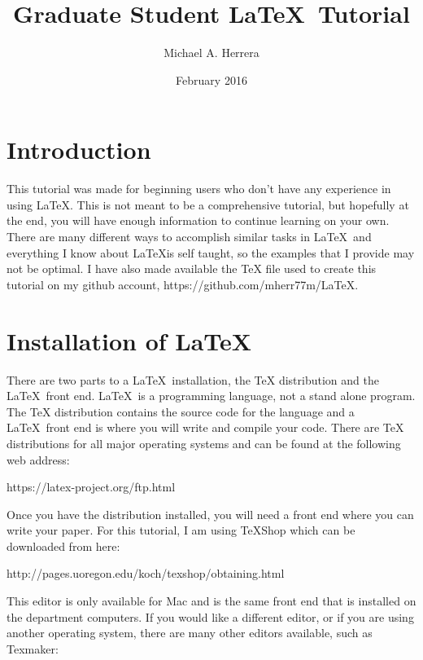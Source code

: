 \documentclass[12pt]{article}
\title{Graduate Student \LaTeX \ Tutorial}
\date{February 2016}
\author{Michael A. Herrera}
\begin{document}
\maketitle

\section{Introduction}

This tutorial was made for beginning users who don't have any experience in using \LaTeX.  This is not meant to be a comprehensive tutorial, but hopefully at the end, you will have enough information to continue learning on your own.  There are many different ways to accomplish similar tasks in \LaTeX \ and everything I know about \LaTeX is self taught, so the examples that I provide may not be optimal.  I have also made available the TeX file used to create this tutorial on my github account, https://github.com/mherr77m/LaTeX.

\section{Installation of \LaTeX}

There are two parts to a \LaTeX \ installation, the TeX distribution and the \LaTeX \ front end.  \LaTeX \ is a programming language, not a stand alone program.  The TeX distribution contains the source code for the language and a \LaTeX \ front end is where you will write and compile your code.  There are TeX distributions for all major operating systems and can be found at the following web address:

\begin{center}
https://latex-project.org/ftp.html
\end{center}

\noindent Once you have the distribution installed, you will need a front end where you can write your paper.  For this tutorial, I am using TeXShop which can be downloaded from here:

\begin{center}
http://pages.uoregon.edu/koch/texshop/obtaining.html
\end{center}

\noindent This editor is only available for Mac and is the same front end that is installed on the department computers.  If you would like a different editor, or if you are using another operating system, there are many other editors available, such as Texmaker:
\end{document}
